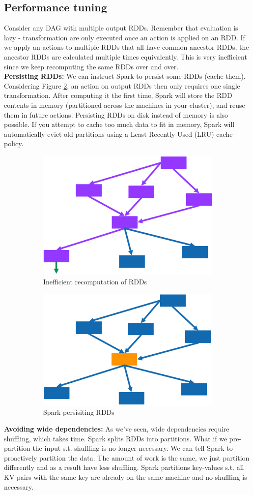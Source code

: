 \documentclass[11pt,oneside,a4paper]{article}
\begin{document}
\subsection{Performance tuning}

Consider any DAG with multiple output RDDs. Remember that evaluation is lazy - transformation are only executed once an action is applied on an RDD. If we apply an actions to multiple RDDs that all have common ancestor RDDs, the ancestor RDDs are calculated multiple times equivalently. This is very inefficient since we keep recomputing the same RDDs over and over.\\

\textbf{Persisting RDDs:} We can instruct Spark to persist some RDDs (cache them). Considering Figure \ref{fig:sparkpersrdds}, an action on output RDDs then only requires one single transformation. After computing it the first time, Spark will store the RDD contents in memory (partitioned across the machines in your cluster), and reuse them in future actions. Persisting RDDs on disk instead of memory is also possible. If you attempt to cache too much data to fit in memory, Spark will automatically evict old partitions using a Least Recently Used (LRU) cache policy. 

\begin{figure}[t!]
	\centering
	\begin{subfigure}[t]{.5\textwidth}
		\centering
		\includegraphics[width=0.25\linewidth]{figures/spark_dag_ineff}
		\caption{Inefficient recomputation of RDDs}
	\end{subfigure}%
	\begin{subfigure}[t]{.5\textwidth}
		\centering
		\includegraphics[width=0.25\linewidth]{figures/spark_persisting_rdds}
		\caption{Spark persisiting RDDs}
		\label{fig:sparkpersrdds}
	\end{subfigure}
	\caption{}
\end{figure}

\textbf{Avoiding wide dependencies:} As we've seen, wide dependencies require shuffling, which takes time. Spark splits RDDs into partitions. What if we pre-partition the input s.t. shuffling is no longer necessary. We can tell Spark to proactively partition the data. The amount of work is the same, we just partition differently and as a result have less shuffling. Spark partitions key-values s.t. all KV pairs with the same key are already on the same machine and no shuffling is necessary.
\end{document}
